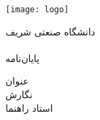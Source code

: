 \begin{center}
\thispagestyle{empty}
\texttt{[image: logo]} \\
\begin{Large}
دانشگاه صنعتی شریف \\
\fadepart \\ [1cm]
پایان‌نامه \falevel \\
\end{Large}
\vskip 3cm
\large{عنوان}  \\ \textbf{\huge{\fatitle}}
\vskip 2cm
\large{نگارش} \\ \Large{\faAuthor}
\vskip 2cm
\large{استاد راهنما} \\ \Large{\fasupervisor}
\vskip 2cm
\large{\fadate}
\end{center}

